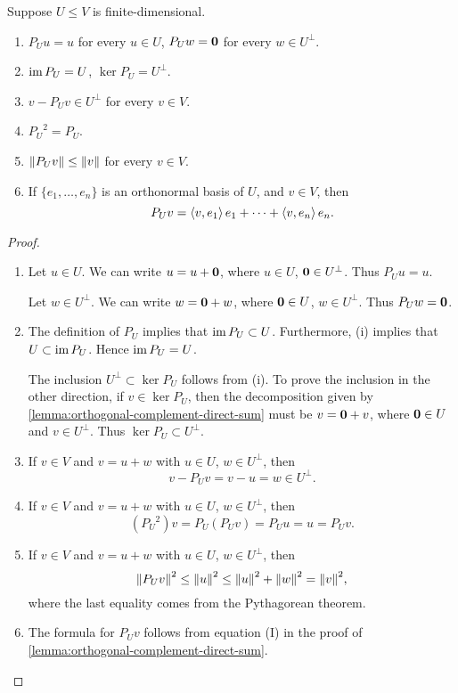 \begin{lemma}\label{lemma:orthogonal-projection-properties}
Suppose $U\le V$ is finite-dimensional.
\begin{enumerate}[label=(\roman*)]
\item $P_U u=u$ for every $u\in U$, $P_U w=\vb{0}$ for every $w\in U^\perp$.
\item $\operatorname{im} P_U=U$, $\ker P_U=U^\perp$.
\item $v-P_U v\in U^\perp$ for every $v\in V$.
\item ${P_U}^2=P_U$.
\item $\norm{P_U v}\le\norm{v}$ for every $v\in V$.
\item If $\{e_1,\dots,e_n\}$ is an orthonormal basis of $U$, and $v\in V$, then
\[P_U v=\left\langle v,e_1\right\rangle e_1+\cdots+\left\langle v,e_n\right\rangle e_n.\]
\end{enumerate}
\end{lemma}

\begin{proof} \
\begin{enumerate}[label=(\roman*)]
\item Let $u\in U$. We can write $u=u+\vb{0}$, where $u\in U$, $\vb{0}\in U^\perp$. Thus $P_U u=u$.

Let $w\in U^\perp$. We can write $w=\vb{0}+w$, where $\vb{0}\in U$, $w\in U^\perp$. Thus $P_U w=\vb{0}$.

\item The definition of $P_U$ implies that $\operatorname{im} P_U\subset U$. Furthermore, (i) implies that $U\subset\operatorname{im} P_U$. Hence $\operatorname{im} P_U=U$.

The inclusion $U^\perp\subset\ker P_U$ follows from (i). To prove the inclusion in the other direction, if $v\in\ker P_U$, then the decomposition given by \ref{lemma:orthogonal-complement-direct-sum} must be $v=\vb{0}+v$, where $\vb{0}\in U$ and $v\in U^\perp$. Thus $\ker P_U\subset U^\perp$.

\item If $v\in V$ and $v=u+w$ with $u\in U$, $w\in U^\perp$, then
\[v-P_U v=v-u=w\in U^\perp.\]

\item If $v\in V$ and $v=u+w$ with $u\in U$, $w\in U^\perp$, then
\[({P_U}^2)v=P_U(P_U v)=P_U u=u=P_U v.\]

\item If $v\in V$ and $v=u+w$ with $u\in U$, $w\in U^\perp$, then
\[\norm{P_U v}^2\le\norm{u}^2\le\norm{u}^2+\norm{w}^2=\norm{v}^2,\]
where the last equality comes from the Pythagorean theorem.

\item The formula for $P_U v$ follows from equation (I) in the proof of \ref{lemma:orthogonal-complement-direct-sum}.
\end{enumerate}
\end{proof}
\pagebreak

